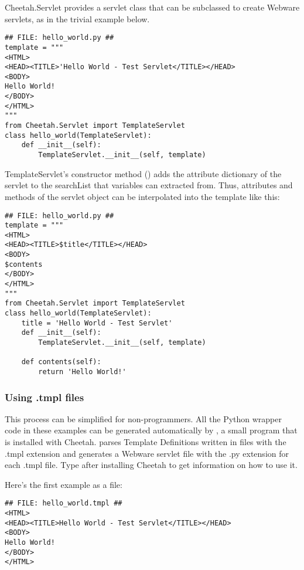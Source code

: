 Cheetah.Servlet provides a servlet class that can be subclassed to create 
Webware servlets, as in the trivial example below.

\begin{verbatim}
## FILE: hello_world.py ##
template = """
<HTML>
<HEAD><TITLE>'Hello World - Test Servlet</TITLE></HEAD>
<BODY>
Hello World!
</BODY>
</HTML>
"""
from Cheetah.Servlet import TemplateServlet
class hello_world(TemplateServlet):
    def __init__(self):
        TemplateServlet.__init__(self, template) 
\end{verbatim}

TemplateServlet's constructor method () adds
the attribute dictionary of the servlet to the searchList that
 variables can extracted from.  Thus, attributes and methods
of the servlet object can be interpolated into the template like this:

\begin{verbatim}
## FILE: hello_world.py ##
template = """
<HTML>
<HEAD><TITLE>$title</TITLE></HEAD>
<BODY>
$contents
</BODY>
</HTML>
"""
from Cheetah.Servlet import TemplateServlet
class hello_world(TemplateServlet):
    title = 'Hello World - Test Servlet'
    def __init__(self):
        TemplateServlet.__init__(self, template) 

    def contents(self):
        return 'Hello World!'
\end{verbatim}

\subsubsection{Using .tmpl files}
\label{webware.inheritance.tmpl}

This process can be simplified for non-programmers. All the Python wrapper code
in these examples can be generated automatically by , a small program
that is installed with Cheetah.  parses Template Definitions
written in files with the .tmpl extension and generates a Webware servlet file
with the .py extension for each .tmpl file.  Type  after
installing Cheetah to get information on how to use it.

Here's the first example as a  file:

\begin{verbatim}
## FILE: hello_world.tmpl ##
<HTML>
<HEAD><TITLE>Hello World - Test Servlet</TITLE></HEAD>
<BODY>
Hello World!
</BODY>
</HTML>
\end{verbatim}

